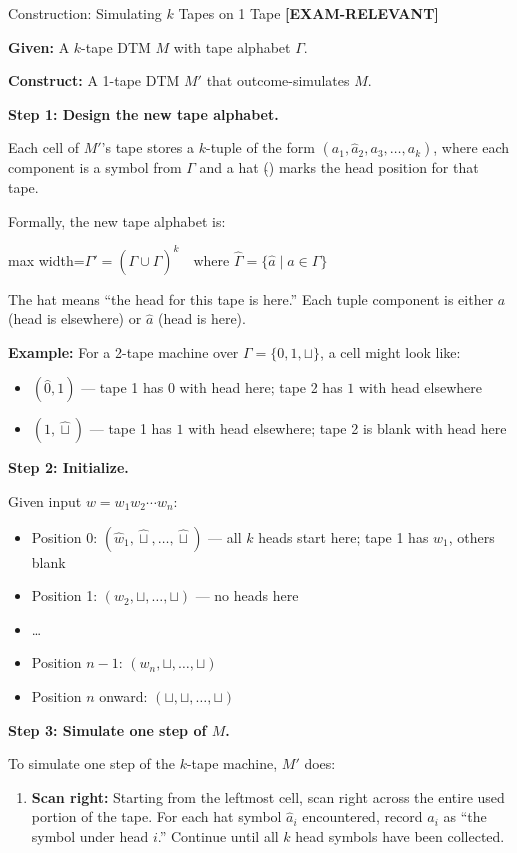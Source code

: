 \documentclass[11pt,a4paper]{article}
\newcommand{\fitmath}[1]{\begin{adjustbox}{max width=\linewidth}$\displaystyle #1$\end{adjustbox}}
\newcommand{\kemark}{\textcolor{red!70!black}{\textbf{[EXAM-RELEVANT]}}}
\begin{document}
\begin{definitionbox}{Construction: Simulating $k$ Tapes on 1 Tape \kemark}

\textbf{Given:} A $k$-tape DTM $M$ with tape alphabet $\Gamma$.

\textbf{Construct:} A 1-tape DTM $M'$ that outcome-simulates $M$.

\textbf{Step 1: Design the new tape alphabet.}

Each cell of $M'$'s tape stores a $k$-tuple of the form $(a_1, \hat{a}_2, a_3, \ldots, a_k)$, where each component is a symbol from $\Gamma$ and a hat ($\hat{}$) marks the head position for that tape.

Formally, the new tape alphabet is:
\fitmath{\Gamma' = (\Gamma \cup \hat{\Gamma})^k \quad \text{where } \hat{\Gamma} = \{\hat{a} \mid a \in \Gamma\}}

The hat means ``the head for this tape is here.'' Each tuple component is either $a$ (head is elsewhere) or $\hat{a}$ (head is here).

\textbf{Example:} For a 2-tape machine over $\Gamma = \{0, 1, \sqcup\}$, a cell might look like:
\begin{itemize}[nosep]
\item $(\hat{0}, 1)$ --- tape 1 has $0$ with head here; tape 2 has $1$ with head elsewhere
\item $(1, \hat{\sqcup})$ --- tape 1 has $1$ with head elsewhere; tape 2 is blank with head here
\end{itemize}

\textbf{Step 2: Initialize.}

Given input $w = w_1 w_2 \cdots w_n$:
\begin{itemize}[nosep]
\item Position 0: $(\hat{w}_1, \hat{\sqcup}, \ldots, \hat{\sqcup})$ --- all $k$ heads start here; tape 1 has $w_1$, others blank
\item Position 1: $(w_2, \sqcup, \ldots, \sqcup)$ --- no heads here
\item \ldots
\item Position $n-1$: $(w_n, \sqcup, \ldots, \sqcup)$
\item Position $n$ onward: $(\sqcup, \sqcup, \ldots, \sqcup)$
\end{itemize}

\textbf{Step 3: Simulate one step of $M$.}

To simulate one step of the $k$-tape machine, $M'$ does:

\begin{enumerate}
\item \textbf{Scan right:} Starting from the leftmost cell, scan right across the entire used portion of the tape. For each hat symbol $\hat{a}_i$ encountered, record $a_i$ as ``the symbol under head $i$.'' Continue until all $k$ head symbols have been collected.


\end{enumerate}
\end{definitionbox}
\end{document}
